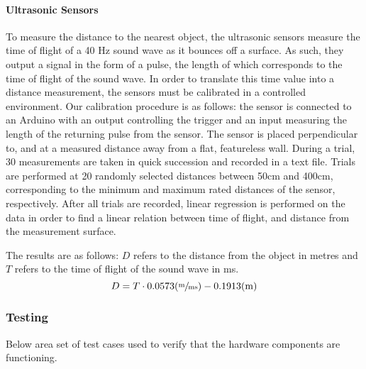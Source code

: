 \documentclass[10pt,letterpaper]{article}
\begin{document}
\paragraph{Ultrasonic Sensors}
To measure the distance to the nearest object, the ultrasonic sensors measure the time of flight of a 40 Hz sound wave as it bounces off a surface. As such, they output a signal in the form of a pulse, the length of which corresponds to the time of flight of the sound wave. In order to translate this time value into a distance measurement, the sensors must be calibrated in a controlled environment. Our calibration procedure is as follows: the sensor is connected to an Arduino with an output controlling the trigger and an input measuring the length of the returning pulse from the sensor. The sensor is placed perpendicular to, and at a measured distance away from a flat, featureless wall. During a trial, 30 measurements are taken in quick succession and recorded in a text file. Trials are performed at 20 randomly selected distances between 50cm and 400cm, corresponding to the minimum and maximum rated distances of the sensor, respectively. After all trials are recorded, linear regression is performed on the data in order to find a linear relation between time of flight, and distance from the measurement surface.
\par
	The results are as follows: $D$ refers to the distance from the object in metres and $T$ refers to the time of flight of the sound wave in ms.\\
    $$D = T \cdot 0.0573 (\sfrac{\textrm{m}}{\textrm{ms}}) - 0.1913 (\textrm{m})$$

\subsubsection{Testing}
Below area set of test cases used to verify that the hardware components are functioning.
\end{document}
